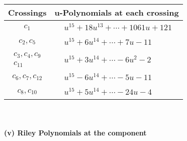 \documentclass[1p]{elsarticle_modified}
\theoremstyle{definition}
\begin{document}
\begin{tabular}{m{50pt}|m{274pt}}
Crossings & \hspace{64pt}u-Polynomials at each crossing \\
\hline $$\begin{aligned}c_{1}\end{aligned}$$&$\begin{aligned}
&u^{15}+18 u^{13}+\cdots+1061 u+121
\end{aligned}$\\
\hline $$\begin{aligned}c_{2},c_{5}\end{aligned}$$&$\begin{aligned}
&u^{15}+6 u^{14}+\cdots+7 u-11
\end{aligned}$\\
\hline $$\begin{aligned}c_{3},c_{4},c_{9}\\c_{11}\end{aligned}$$&$\begin{aligned}
&u^{15}+3 u^{14}+\cdots-6 u^2-2
\end{aligned}$\\
\hline $$\begin{aligned}c_{6},c_{7},c_{12}\end{aligned}$$&$\begin{aligned}
&u^{15}-6 u^{14}+\cdots-5 u-11
\end{aligned}$\\
\hline $$\begin{aligned}c_{8},c_{10}\end{aligned}$$&$\begin{aligned}
&u^{15}+5 u^{14}+\cdots-24 u-4
\end{aligned}$\\
\hline
\end{tabular}\\~\\
\newpage\renewcommand{\arraystretch}{1}
\flushleft \textbf{(v) Riley Polynomials at the component}\newline \\
\end{document}
